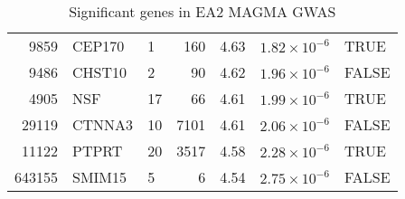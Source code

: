 \begin{table}[ht]
\begin{adjustbox}{totalheight=10in}
\begin{tabular}{rllrrrl}
  9859 & CEP170 & 1 & 160 & 4.63 & $1.82 \times 10^{-6}$ & TRUE \\ 
  9486 & CHST10 & 2 &  90 & 4.62 & $1.96 \times 10^{-6}$ & FALSE \\ 
  4905 & NSF & 17 &  66 & 4.61 & $1.99 \times 10^{-6}$ & TRUE \\ 
  29119 & CTNNA3 & 10 & 7101 & 4.61 & $2.06 \times 10^{-6}$ & FALSE \\ 
  11122 & PTPRT & 20 & 3517 & 4.58 & $2.28 \times 10^{-6}$ & TRUE \\ 
  643155 & SMIM15 & 5 &   6 & 4.54 & $2.75 \times 10^{-6}$ & FALSE \\ 
   \hline
\end{tabular}
\end{adjustbox}
\caption{Significant genes in EA2 MAGMA GWAS} 
\label{tab:Significant genes in EA2 MAGMA GWAS}
\end{table}





